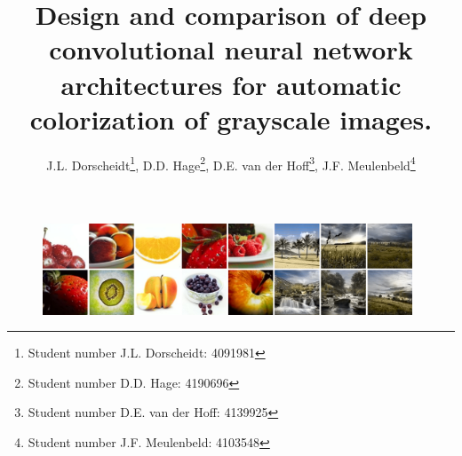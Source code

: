 \documentclass[journal,onecolumn]{IEEEtran}
\begin{document}
\title{\LARGE Design and comparison of deep convolutional neural network architectures for automatic colorization of grayscale images.}

\author{J.L. Dorscheidt\footnote{Student number J.L. Dorscheidt: 4091981}, D.D. Hage\footnote{Student number D.D. Hage: 4190696}, D.E. van der Hoff\footnote{Student number D.E. van der Hoff: 4139925}, J.F. Meulenbeld\footnote{Student number J.F. Meulenbeld: 4103548}}%
\maketitle
\vspace{-30px}
\begin{figure}[H]
	\centering
	\includegraphics[width=0.98\textwidth]{cover}
\end{figure}

%
\begin{abstract}

\end{abstract}


\IEEEpeerreviewmaketitle










\FloatBarrier


\newpage
\appendices




 
\end{document}
